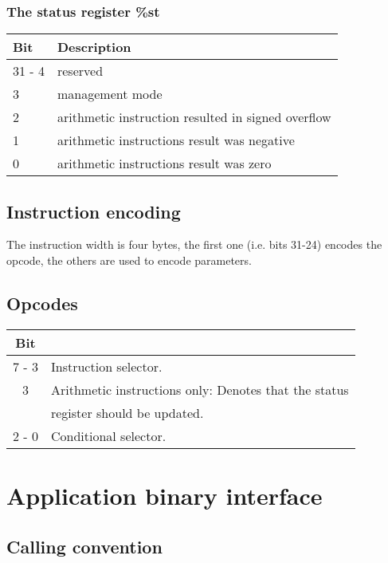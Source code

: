 \documentclass{article}
\begin{document}
\subsubsection{The status register \%st}
\begin{center}
  \begin{tabular}{l|l}
    Bit    & Description \\
    \hline
    31 - 4 & reserved \\
    3      & management mode \\
    2      & arithmetic instruction resulted in signed overflow \\
    1      & arithmetic instructions result was negative \\
    0      & arithmetic instructions result was zero \\
  \end{tabular}
\end{center}

\subsection{Instruction encoding}

The instruction width is four bytes, the first one (i.e. bits 31-24)
encodes the opcode, the others are used to encode parameters.

\subsection{Opcodes}

\begin{center}
  \begin{tabular}{c|l}
    Bit & \\
    \hline
    7 - 3  & Instruction selector. \\
    3      & Arithmetic instructions only: Denotes that the status \\
           & register should be updated. \\
    2 - 0  & Conditional selector. \\
  \end{tabular}
\end{center}

\section{Application binary interface}

\subsection{Calling convention}
\end{document}
